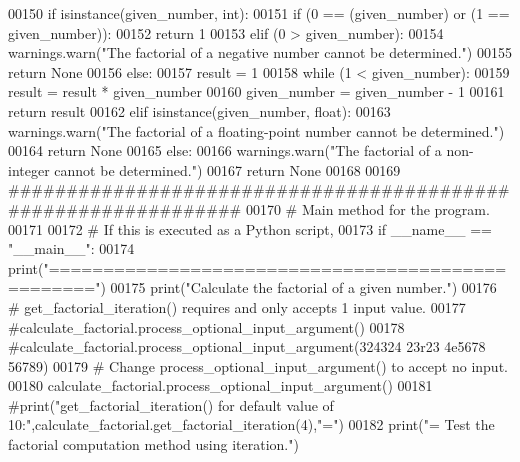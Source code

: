\begin{DoxyCode}
00150         \textcolor{keywordflow}{if} isinstance(given\_number, int):
00151             \textcolor{keywordflow}{if} (0 == (given\_number) \textcolor{keywordflow}{or} (1 == given\_number)):
00152                 \textcolor{keywordflow}{return} 1
00153             \textcolor{keywordflow}{elif} (0 > given\_number):
00154                 warnings.warn(\textcolor{stringliteral}{"The factorial of a negative number cannot be determined."})
00155                 \textcolor{keywordflow}{return} \textcolor{keywordtype}{None}
00156             \textcolor{keywordflow}{else}:
00157                 result = 1
00158                 \textcolor{keywordflow}{while} (1 < given\_number):
00159                     result = result * given\_number
00160                     given\_number = given\_number - 1
00161                 \textcolor{keywordflow}{return} result
00162         \textcolor{keywordflow}{elif} isinstance(given\_number, float):
00163             warnings.warn(\textcolor{stringliteral}{"The factorial of a floating-point number cannot be determined."})
00164             \textcolor{keywordflow}{return} \textcolor{keywordtype}{None}
00165         \textcolor{keywordflow}{else}:
00166             warnings.warn(\textcolor{stringliteral}{"The factorial of a non-integer cannot be determined."})
00167             \textcolor{keywordflow}{return} \textcolor{keywordtype}{None}
00168 
00169 \textcolor{comment}{###############################################################}
00170 \textcolor{comment}{# Main method for the program.}
00171 
00172 \textcolor{comment}{#   If this is executed as a Python script,}
00173 \textcolor{keywordflow}{if} \_\_name\_\_ == \textcolor{stringliteral}{"\_\_main\_\_"}:
00174     print(\textcolor{stringliteral}{"=================================================="})
00175     print(\textcolor{stringliteral}{"Calculate the factorial of a given number."})
00176     \textcolor{comment}{# get\_factorial\_iteration() requires and only accepts 1 input value.}
00177     \textcolor{comment}{#calculate\_factorial.process\_optional\_input\_argument()}
00178     \textcolor{comment}{#calculate\_factorial.process\_optional\_input\_argument(324324 23r23 4e5678 56789)}
00179     \textcolor{comment}{# Change process\_optional\_input\_argument() to accept no input.}
00180     calculate\_factorial.process\_optional\_input\_argument()
00181     \textcolor{comment}{#print("get\_factorial\_iteration() for default value of
       10:",calculate\_factorial.get\_factorial\_iteration(4),"=")}
00182     print(\textcolor{stringliteral}{"=    Test the factorial computation method using iteration."})

\end{DoxyCode}
